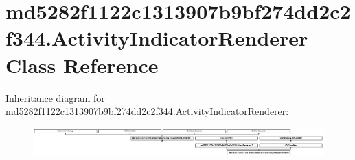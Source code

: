\hypertarget{classmd5282f1122c1313907b9bf274dd2c2f344_1_1ActivityIndicatorRenderer}{}\section{md5282f1122c1313907b9bf274dd2c2f344.\+Activity\+Indicator\+Renderer Class Reference}
\label{classmd5282f1122c1313907b9bf274dd2c2f344_1_1ActivityIndicatorRenderer}
Inheritance diagram for md5282f1122c1313907b9bf274dd2c2f344.\+Activity\+Indicator\+Renderer\+:\begin{figure}[H]
\begin{center}
\leavevmode
\includegraphics[height=1.098039cm]{classmd5282f1122c1313907b9bf274dd2c2f344_1_1ActivityIndicatorRenderer}
\end{center}
\end{figure}
